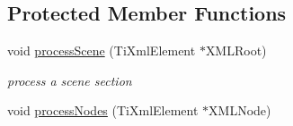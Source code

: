 \subsection*{Protected Member Functions}
\begin{DoxyCompactItemize}
\item 
void \hyperlink{class_ogre_1_1_dot_scene_loader_a05a2ebb03c3be72af3ee072fc7211d06}{process\+Scene} (Ti\+Xml\+Element $\ast$X\+M\+L\+Root)\hypertarget{class_ogre_1_1_dot_scene_loader_a05a2ebb03c3be72af3ee072fc7211d06}{}\label{class_ogre_1_1_dot_scene_loader_a05a2ebb03c3be72af3ee072fc7211d06}

\begin{DoxyCompactList}\small\item\em process a scene section \end{DoxyCompactList}\item 
void \hyperlink{class_ogre_1_1_dot_scene_loader_acdcc1c065c8733156bb97c17c07f6dec}{process\+Nodes} (Ti\+Xml\+Element $\ast$X\+M\+L\+Node)\hypertarget{class_ogre_1_1_dot_scene_loader_acdcc1c065c8733156bb97c17c07f6dec}{}\label{class_ogre_1_1_dot_scene_loader_acdcc1c065c8733156bb97c17c07f6dec}


\end{DoxyCompactItemize}

